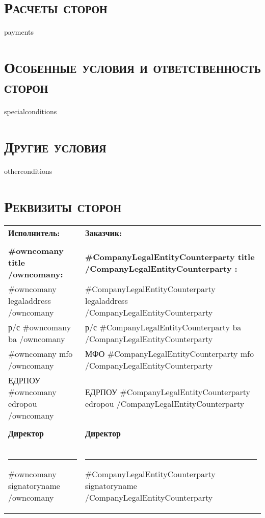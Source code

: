 {{{{{{\section{\large \textbf{\textsc{Расчеты сторон}}}
{{payments}}

\section{\large \textbf{\textsc{Особенные условия и ответственность сторон}}}
{{specialconditions}}

\section{\large \textbf{\textsc{Другие условия}}}
{{otherconditions}}

\section{\large \textbf{\textsc{Реквизиты сторон}}}
\thispagestyle{empty}

\begin{tabularx}{\textwidth}{ X@{\hskip 0.5in} X }

\textbf{Исполнитель:}  & \textbf{Заказчик:} \\
 & \\
\textbf{ {{#owncomany}} {{title}}  {{/owncomany}}:} & \textbf{ {{#CompanyLegalEntityCounterparty}} {{title}} {{/CompanyLegalEntityCounterparty}} :} \\
{{#owncomany}} {{legaladdress}}  {{/owncomany}} &  {{#CompanyLegalEntityCounterparty}}  {{legaladdress}}  {{/CompanyLegalEntityCounterparty}}  \\
р/с   {{#owncomany}} {{ba}}  {{/owncomany}} &  р/с  {{#CompanyLegalEntityCounterparty}}  {{ba}}  {{/CompanyLegalEntityCounterparty}}  \\
{{#owncomany}} {{mfo}}  {{/owncomany}} &  МФО {{#CompanyLegalEntityCounterparty}}  {{mfo}}   {{/CompanyLegalEntityCounterparty}}   \\
ЕДРПОУ {{#owncomany}} {{edropou}}  {{/owncomany}} & ЕДРПОУ {{#CompanyLegalEntityCounterparty}} {{edropou}}  {{/CompanyLegalEntityCounterparty}}  \\
 & \\
\textbf{Директор}  & \textbf{Директор} \\
 & \\
 & \\
 & \\
\noindent\rule{4cm}{0.5pt} {{#owncomany}} {{signatoryname}}  {{/owncomany}}   & \noindent\rule{5cm}{0.5pt} {{#CompanyLegalEntityCounterparty}} {{signatoryname}}  {{/CompanyLegalEntityCounterparty}}  \\
\end{tabularx}


}}}}}}
